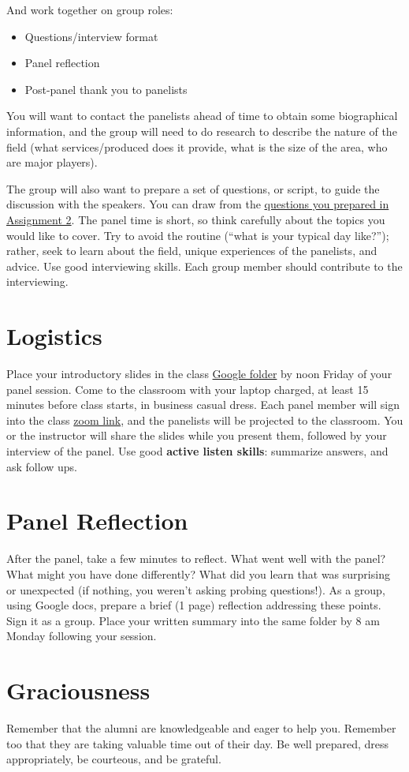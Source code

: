\documentclass[11pt]{article}
\begin{document}
And work together on group roles:
\begin{itemize}
\item Questions/interview format
\item Panel reflection
\item Post-panel thank you to panelists
\end{itemize}

You will want to contact the panelists ahead of time to obtain some biographical information, and the group will need to do research to describe the nature of the field (what services/produced does it provide, what is the size of the area, who are major players).

The group will also want to prepare a set of questions, or script, to guide the discussion with the speakers. You can draw from the \href{https://docs.google.com/document/d/1xEKQUh8swVG-FaPlv5Zdm7GvCSkyAsRE-FH6ohEHZMg/edit?usp=sharing}{questions you prepared in Assignment 2}. The panel time is short, so think carefully about the topics you would like to cover. Try to avoid the routine (``what is your typical day like?''); rather, seek to learn about the field, unique experiences of the panelists, and advice. Use good interviewing skills. Each group member should  contribute to the interviewing. 


\section{Logistics}
\label{sec:org3a286d6}
Place your introductory slides in the class \href{https://drive.google.com/drive/folders/1r\_wSSi8Jvphhkkfh8ujKThlI-RCvBMRM?usp=share\_link}{Google folder} by noon Friday of your panel session. Come to the classroom with your laptop charged, at least 15 minutes before class starts, in business casual dress.  Each panel member will sign into the class \href{https://notredame.zoom.us/j/92948211493?pwd=WU1nbCt4S3MwOHdxM245Rm5pWXFFZz09}{zoom link}, and the panelists will be projected to the classroom. You or the instructor will share the slides while you present them, followed by your interview of the panel. Use good \textbf{active listen skills}: summarize answers, and ask follow ups.

\section{Panel Reflection}
\label{sec:orgaf70d72}
After the panel, take a few minutes to reflect. What went well with the panel? What might you have done differently? What did you learn that was surprising or unexpected (if nothing, you weren't asking probing questions!). As a group, using Google docs, prepare a brief (1 page) reflection addressing these points. Sign it as a group. Place your written summary into the same folder by 8 am Monday following your session. 

\section{Graciousness}
\label{sec:orgcb85447}
Remember that the alumni are knowledgeable and eager to help you. Remember too that they are taking valuable time out of their day. Be well prepared, dress appropriately, be courteous, and be grateful. 
\end{document}
